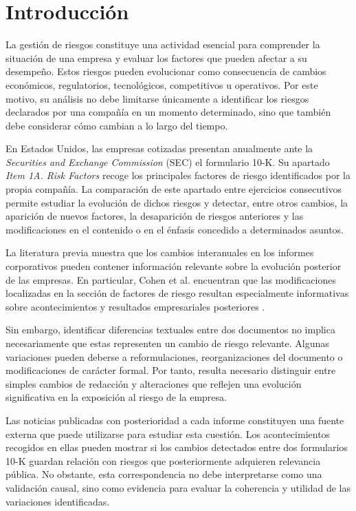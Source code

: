 
\section{Introducción}

La gestión de riesgos constituye una actividad esencial para comprender la situación de una empresa y evaluar los factores que pueden afectar a su desempeño. Estos riesgos pueden evolucionar como consecuencia de cambios económicos, regulatorios, tecnológicos, competitivos u operativos. Por este motivo, su análisis no debe limitarse únicamente a identificar los riesgos declarados por una compañía en un momento determinado, sino que también debe considerar cómo cambian a lo largo del tiempo.

En Estados Unidos, las empresas cotizadas presentan anualmente ante la \textit{Securities and Exchange Commission} (SEC) el formulario 10-K. Su apartado \textit{Item 1A. Risk Factors} recoge los principales factores de riesgo identificados por la propia compañía. La comparación de este apartado entre ejercicios consecutivos permite estudiar la evolución de dichos riesgos y detectar, entre otros cambios, la aparición de nuevos factores, la desaparición de riesgos anteriores y las modificaciones en el contenido o en el énfasis concedido a determinados asuntos.

La literatura previa muestra que los cambios interanuales en los
informes corporativos pueden contener información relevante sobre la
evolución posterior de las empresas. En particular, Cohen et al.
encuentran que las modificaciones localizadas en la sección de factores
de riesgo resultan especialmente informativas sobre acontecimientos y
resultados empresariales posteriores
\cite{cohen_malloy_nguyen_lazy_prices}.

Sin embargo, identificar diferencias textuales entre dos documentos no implica necesariamente que estas representen un cambio de riesgo relevante. Algunas variaciones pueden deberse a reformulaciones, reorganizaciones del documento o modificaciones de carácter formal. Por tanto, resulta necesario distinguir entre simples cambios de redacción y alteraciones que reflejen una evolución significativa en la exposición al riesgo de la empresa.

Las noticias publicadas con posterioridad a cada informe constituyen una fuente externa que puede utilizarse para estudiar esta cuestión. Los acontecimientos recogidos en ellas pueden mostrar si los cambios detectados entre dos formularios 10-K guardan relación con riesgos que posteriormente adquieren relevancia pública. No obstante, esta correspondencia no debe interpretarse como una validación causal, sino como evidencia para evaluar la coherencia y utilidad de las variaciones identificadas.

